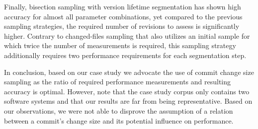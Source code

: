 Finally, bisection sampling with version lifetime segmentation has shown high
accuracy for almost all parameter combinations, yet compared to the previous
sampling strategies, the required number of revisions to assess is
significantly higher. Contrary to changed-files sampling that also utilizes an
initial sample for which twice the number of measurements is required, this
sampling strategy additionally requires two performance requirements for each
segmentation step.

In conclusion, based on our case study we advocate the use of commit change
size sampling as the ratio of required performance measurements and resulting
accuracy is optimal. However, note that the case study corpus only contains two
software systems and that our results are far from being representative. Based
on our observations, we were not able to disprove the assumption of a relation
between a commit’s change size and its potential influence on performance.
